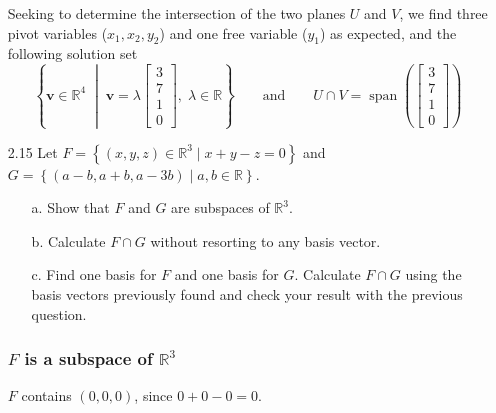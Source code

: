 \documentclass[11pt]{article}
\newcommand{\R}{\mathbb{R}}
\newcommand{\vect}[1]{\bm{#1}}      %
\newcommand{\set}[1]{\left\{#1\right\}}                  %
\newcommand{\args}[1]{\!\left(#1\right)}                 %
\DeclareMathOperator{\Span}{span}
\theoremstyle{definition}
\theoremstyle{plain}
\theoremstyle{remark}
\newcounter{subsubsubsection}[subsubsection]
\begin{document}
\begin{enumerate}
          Seeking to determine the intersection of the two planes $U$ and $V$, we find three pivot variables ($x_1,
              x_2, y_2$) and one free variable ($y_1$) as expected, and the following solution set
          \[
              \set{
                  \vect{v} \in \R^4
                  \; \middle | \;
                  \vect{v} = \lambda
                  \begin{bmatrix}
                      3 \\ 7 \\ 1 \\ 0
                  \end{bmatrix}
                  \! , \;
                  \lambda \in \R
              }
              \qquad
              \text{and}
              \qquad
              U \cap V =
              \Span \args{
                  \begin{bmatrix}
                      3 \\ 7 \\ 1 \\ 0
                  \end{bmatrix}
              }
          \]

          \pagebreak

    \item[2.15] Let $F = \set{ (x, y, z) \in \R^3 \mid x + y - z = 0 }$ and
          $G = \set{ (a - b, a + b, a - 3b) \mid a, b \in \R }$.

          \begin{enumerate}
              \item[a.] Show that $F$ and $G$ are subspaces of $\R^3$.

              \item[b.] Calculate $F \cap G$ without resorting to any basis vector.

              \item[c.] Find one basis for $F$ and one basis for $G$.  Calculate $F \cap G$ using the basis vectors
                    previously found and check your result with the previous question.
          \end{enumerate}

          \subsubsection*{$F$ is a subspace of $\R^3$}


          $F$ contains $(0, 0, 0)$, since $0 + 0 - 0 = 0$.


\end{enumerate}
\end{document}
